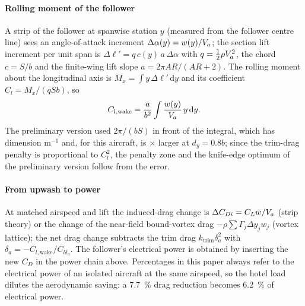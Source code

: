 \paragraph{Rolling moment of the follower} A strip of the follower at spanwise station $y$ (measured from the follower centre line) sees an angle-of-attack increment $\Delta\alpha(y)=w(y)/V_a$; the section lift increment per unit span is $\Delta\ell'=q\,c(y)\,a\,\Delta\alpha$ with $q=\tfrac12\rho V_a^2$, the chord $c=S/b$ and the finite-wing lift slope $a=2\pi AR/(AR+2)$. The rolling moment about the longitudinal axis is $M_x=\int y\,\Delta\ell'\,\mathrm{d}y$ and its coefficient $C_l=M_x/(qSb)$, so
\begin{equation}C_{l,\mathrm{wake}}=\frac{a}{b^2}\int\frac{w(y)}{V_a}\,y\,\mathrm{d}y.\end{equation}
The preliminary version used $2\pi/(bS)$ in front of the integral, which has dimension $\mathrm{m}^{-1}$ and, for this aircraft, is \nclPubOverCorr$\times$ larger at $d_y=0.8b$; since the trim-drag penalty is proportional to $C_l^2$, the penalty zone and the knife-edge optimum of the preliminary version follow from the error.

\paragraph{From upwash to power} At matched airspeed and lift the induced-drag change is $\Delta C_{Di}=C_L\bar w/V_a$ (strip theory) or the change of the near-field bound-vortex drag $-\rho\sum\Gamma_j\Delta y_j w_j$ (vortex lattice); the net drag change subtracts the trim drag $k_{\mathrm{trim}}\delta_a^2$ with $\delta_a=-C_{l,\mathrm{wake}}/C_{l\delta_a}$. The follower's electrical power is obtained by inserting the new $C_D$ in the power chain above. Percentages in this paper always refer to the electrical power of an isolated aircraft at the same airspeed, so the hotel load dilutes the aerodynamic saving: a \SI{7.7}{\percent} drag reduction becomes \SI{6.2}{\percent} of electrical power.

